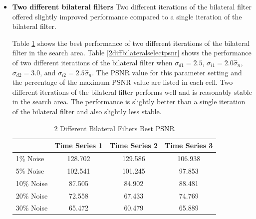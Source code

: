 \documentclass[11pt]{article}
\theoremstyle{definition}
\begin{document}
\begin{itemize}
\item \textbf{Two different bilateral filters} 
  Two different iterations of the bilateral filter offered slightly
  improved performance compared to a single iteration of the bilateral
  filter.

  Table \ref{2diffbilateralbestpsnr} shows the best performance of two
  different iterations of the bilateral filter in the search area.
  Table \ref{2diffbilateralselectpsnr} shows the performance of two
  different iterations of the bilateral filter when $\sigma_{d1} =
  2.5$, $\sigma_{i1} = 2.0 \hat{\sigma}_n$, $\sigma_{d2} = 3.0$, and
  $\sigma_{i2} = 2.5 \hat{\sigma}_n$. The PSNR value for this
  parameter setting and the percentage of the maximum PSNR value are
  listed in each cell. Two different iterations of the bilateral
  filter performs well and is reasonably stable in the search area.
  The performance is slightly better than a single iteration of the
  bilateral filter and also slightly less stable.

\begin{table}[!h]
\small
\begin{center}
\begin{tabular}{lccc}
\hline 
 & Time Series 1 & Time Series 2 & Time Series 3 \\ \hline
1\% Noise & 128.702 & 129.586 & 106.938 \\ \hline
5\% Noise & 102.541 & 101.245 & 97.853 \\ \hline
10\% Noise & 87.505 & 84.902 & 88.481 \\ \hline
20\% Noise & 72.558 & 67.433 & 74.769 \\ \hline
30\% Noise & 65.472 & 60.479 & 65.889\\ \hline
\end{tabular}
\caption{2 Different Bilateral Filters Best PSNR}
\label{2diffbilateralbestpsnr}
\end{center}
\end{table}


\end{itemize}
\end{document}
